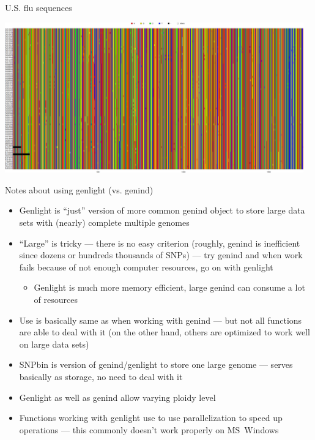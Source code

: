 \documentclass[compress, xelatex, 11pt, xcolor=svgnames, aspectratio=169,
	hyperref={
		bookmarks=true,
		unicode=true,
		colorlinks=true,
		pdftitle={Molecular data in R},
		plainpages=false,
		pdfauthor={Vojtech Zeisek},
		pdfsubject={Course about phylogeny and evolution in R},
		pdfcreator={XeLaTeX},
		pdfkeywords={R, evolution, phylogeny, molecular data},
		linkcolor=Crimson, %
		anchorcolor=Magenta, %
		citecolor=Magenta, %
		filecolor=Magenta, %
		menucolor=Magenta, %
		urlcolor=DodgerBlue, %
		},
	url={hyphens, lowtilde} %
	]{beamer}
\begin{document}
\begin{frame}{U.S. flu sequences}
	\begin{center}
		\includegraphics[height=6.5cm]{sequences_usflu.png}
	\end{center}
\end{frame}

\begin{frame}{Notes about using genlight (vs. genind)}
	\begin{itemize}
		\item Genlight is \enquote{just} version of more common genind object to store large data sets with (nearly) complete multiple genomes
		\item \enquote{Large} is tricky --- there is no easy criterion (roughly, genind is inefficient since dozens or hundreds thousands of SNPs) --- try genind and when work fails because of not enough computer resources, go on with genlight
		\begin{itemize}
			\item Genlight is much more memory efficient, large genind can consume a lot of resources
		\end{itemize}
		\item Use is basically same as when working with genind --- but not all functions are able to deal with it (on the other hand, others are optimized to work well on large data sets)
		\item SNPbin is version of genind/genlight to store one large genome --- serves basically as storage, no need to deal with it
		\item Genlight as well as genind allow varying ploidy level
		\item Functions working with genlight use to use parallelization to speed up operations --- this commonly doesn't work properly on MS~Windows
	\end{itemize}
\end{frame}
\end{document}
